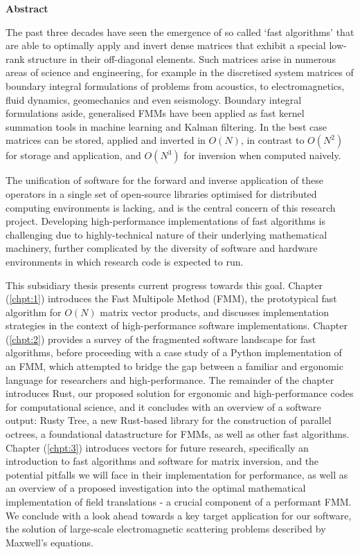 \thispagestyle{plain}

\begin{center}
    \textbf{Abstract}
\end{center}

The past three decades have seen the emergence of so called `fast algorithms' that are able to optimally apply and invert dense matrices that exhibit a special low-rank structure in their off-diagonal elements. Such matrices arise in numerous areas of science and engineering, for example in the discretised system matrices of boundary integral formulations of problems from acoustics, to electromagnetics, fluid dynamics, geomechanics and even seismology. Boundary integral formulations aside, generalised \gls{FMM}s have been applied  as fast kernel summation tools in machine learning and Kalman filtering. In the best case matrices can be stored, applied and inverted in $O(N)$, in contrast to $O(N^2)$ for storage and application, and $O(N^3)$ for inversion when computed naively.

The unification of software for the forward and inverse application of these operators in a single set of open-source libraries optimised for distributed computing environments is lacking, and is the central concern of this research project. Developing high-performance implementations of fast algorithms is challenging due to highly-technical nature of their underlying mathematical machinery, further complicated by the diversity of software and hardware environments in which research code is expected to run.

This subsidiary thesis presents current progress towards this goal. Chapter (\ref{chpt:1}) introduces the Fast Multipole Method (\gls{FMM}), the prototypical fast algorithm for $O(N)$ matrix vector products, and discusses implementation strategies in the context of high-performance software implementations. Chapter (\ref{chpt:2}) provides a survey of the fragmented software landscape for fast algorithms, before proceeding with a case study of a Python implementation of an FMM, which attempted to bridge the gap between a familiar and ergonomic language for researchers and high-performance. The remainder of the chapter introduces Rust, our proposed solution for ergonomic and high-performance codes for computational science, and it concludes with an overview of a software output: Rusty Tree, a new Rust-based library for the construction of parallel octrees, a foundational datastructure for \gls{FMM}s, as well as other fast algorithms. Chapter (\ref{chpt:3}) introduces vectors for future research, specifically an introduction to fast algorithms and software for matrix inversion, and the potential pitfalls we will face in their implementation for performance, as well as an overview of a proposed investigation into the optimal mathematical implementation of field translations - a crucial component of a performant FMM. We conclude with a look ahead towards a key target application for our software, the solution of large-scale electromagnetic scattering problems described by Maxwell's equations.
